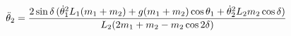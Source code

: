 \documentclass[preview]{standalone}
\begin{document}
\begin{align*}
\special{dvisvgm:raw <g id='unique000'>}\ddot{\theta}_2 = \frac{2\sin\delta\,(\dot{\theta}_1^2 L_1(m_1+m_2)+g(m_1+m_2)\cos\theta_1+\dot{\theta}_2^2 L_2 m_2\cos\delta)}{L_2(2m_1+m_2-m_2\cos 2\delta)}\special{dvisvgm:raw </g>}
\end{align*}
\end{document}
